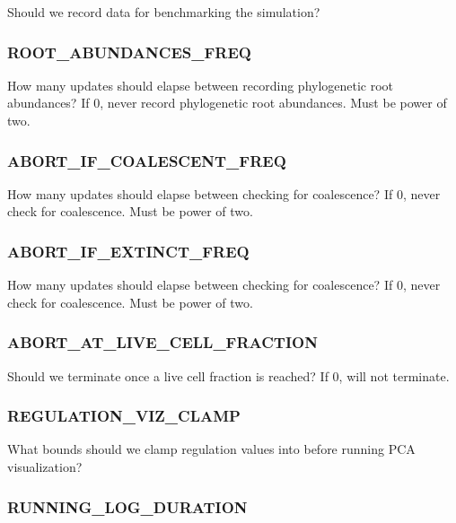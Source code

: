 
Should we record data for benchmarking the simulation?

\subsubsection{ROOT\_ABUNDANCES\_FREQ}


How many updates should elapse between recording phylogenetic root abundances?
If 0, never record phylogenetic root abundances.
Must be power of two.

\subsubsection{ABORT\_IF\_COALESCENT\_FREQ}


How many updates should elapse between checking for coalescence? If 0, never check for coalescence.
Must be power of two.

\subsubsection{ABORT\_IF\_EXTINCT\_FREQ}


How many updates should elapse between checking for coalescence? If 0, never check for coalescence. Must be power of two.

\subsubsection{ABORT\_AT\_LIVE\_CELL\_FRACTION}


Should we terminate once a live cell fraction is reached? If 0, will not terminate.

\subsubsection{REGULATION\_VIZ\_CLAMP}


What bounds should we clamp regulation values into before running PCA visualization?

\subsubsection{RUNNING\_LOG\_DURATION}

